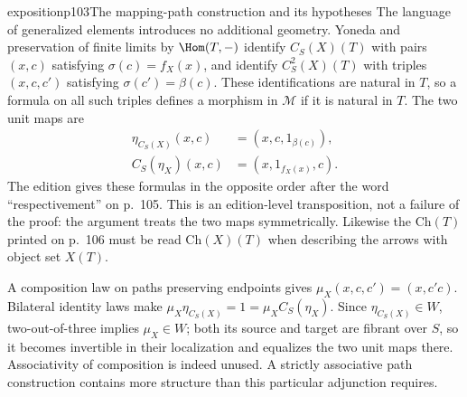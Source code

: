 \begin{dcomment}{exposition}{p103}{The mapping-path construction and its hypotheses}
The language of generalized elements introduces no additional geometry. Yoneda and preservation of finite limits by $\Hom(T,-)$ identify $C_S(X)(T)$ with pairs $(x,c)$ satisfying $\sigma(c)=f_X(x)$, and identify $C_S^2(X)(T)$ with triples $(x,c,c')$ satisfying $\sigma(c')=\beta(c)$. These identifications are natural in $T$, so a formula on all such triples defines a morphism in $\mathcal M$ if it is natural in $T$. The two unit maps are
\[
\begin{aligned}
\eta_{C_S(X)}(x,c)&=(x,c,1_{\beta(c)}),\\
C_S(\eta_X)(x,c)&=(x,1_{f_X(x)},c).
\end{aligned}
\]
The edition gives these formulas in the opposite order after the word ``respectivement'' on p.~105. This is an edition-level transposition, not a failure of the proof: the argument treats the two maps symmetrically. Likewise the $\mathrm{Ch}(T)$ printed on p.~106 must be read $\mathrm{Ch}(X)(T)$ when describing the arrows with object set $X(T)$.

A composition law on paths preserving endpoints gives $\mu_X(x,c,c')=(x,c'c)$. Bilateral identity laws make $\mu_X\eta_{C_S(X)}=1=\mu_XC_S(\eta_X)$. Since $\eta_{C_S(X)}\in W$, two-out-of-three implies $\mu_X\in W$; both its source and target are fibrant over $S$, so it becomes invertible in their localization and equalizes the two unit maps there. Associativity of composition is indeed unused. A strictly associative path construction contains more structure than this particular adjunction requires.
\end{dcomment}

